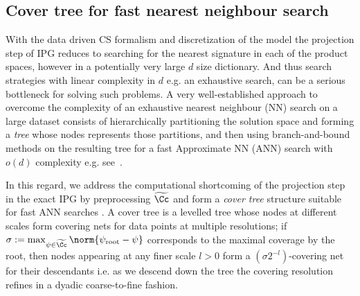 \subsection{Cover tree for fast nearest neighbour search}
\label{sec:covertree}
With the data driven CS formalism and discretization of the model  %
the projection step of IPG reduces to searching for the nearest signature in each of the product spaces, however in a potentially very large $d$ size dictionary. %
And thus search strategies with linear complexity in $d$ e.g. an exhaustive search, can be a serious bottleneck for solving such problems. %
A very well-established approach to overcome the complexity of an exhaustive nearest neighbour (NN) search on a large dataset consists of hierarchically partitioning the solution space and forming a \emph{tree} whose nodes represents those partitions, and then using branch-and-bound methods on the resulting tree for a fast Approximate NN (ANN) search with $o(d)$ complexity e.g. see~\cite{Navigating,beygelzimer2006cover}.

In this regard, we address the computational shortcoming of the projection step in the exact IPG by preprocessing $\widetilde \Cc$ and form a \emph{cover tree} structure suitable for fast ANN searches \cite{beygelzimer2006cover}. 
A cover tree is a levelled tree whose nodes at different scales form covering nets for data points at multiple resolutions; 
if $\sigma:=\max_{\psi\in\widetilde \Cc}\norm{\psi_\text{root}-\psi}$ corresponds to the maximal coverage by the root, then  
nodes appearing at any finer scale $l>0$ form a $(\sigma 2^{-l})$-covering net for their descendants i.e. as we descend down the tree the covering resolution refines in a dyadic coarse-to-fine fashion.

